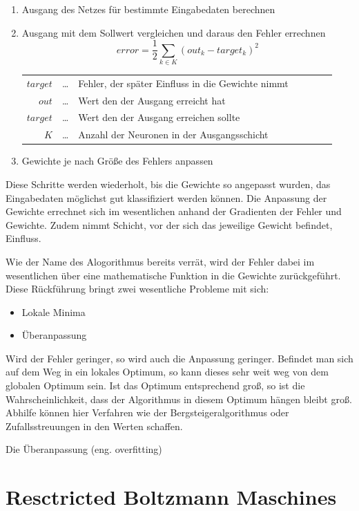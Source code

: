 \begin{enumerate}
\item Ausgang des Netzes für bestimmte Eingabedaten berechnen
\item Ausgang mit dem Sollwert vergleichen und daraus den Fehler errechnen
	$$error = \frac{1}{2}\sum_{k \in K}(out_k-target_k)^2$$
	\begin{center}\begin{tabular}{rclcrcl}
		$target$ & \dots & Fehler, der später Einfluss in die Gewichte nimmt\\
		$out$ & \dots & Wert den der Ausgang erreicht hat\\
		$target$ & \dots & Wert den der Ausgang erreichen sollte\\ 
		$K$ & \dots & Anzahl der Neuronen in der Ausgangsschicht\\
	\end{tabular}\end{center}
\item Gewichte je nach Größe des Fehlers anpassen
\end{enumerate}

Diese Schritte werden wiederholt, bis die Gewichte so angepasst wurden, das Eingabedaten möglichst gut klassifiziert werden können. Die Anpassung der Gewichte errechnet sich im wesentlichen anhand der Gradienten der Fehler und Gewichte. Zudem nimmt Schicht, vor der sich das jeweilige Gewicht befindet, Einfluss.

Wie der Name des Alogorithmus bereits verrät, wird der Fehler dabei im wesentlichen über eine mathematische Funktion in die Gewichte zurückgeführt. Diese Rückführung bringt zwei wesentliche Probleme mit sich:

\begin{itemize}
\item Lokale Minima
\item Überanpassung
\end{itemize}

Wird der Fehler geringer, so wird auch die Anpassung geringer. Befindet man sich auf dem Weg in ein lokales Optimum, so kann dieses sehr weit weg von dem globalen Optimum sein. Ist das Optimum entsprechend groß, so ist die Wahrscheinlichkeit, dass der Algorithmus in diesem Optimum hängen bleibt groß. Abhilfe können hier Verfahren wie der Bergsteigeralgorithmus oder Zufallsstreuungen in den Werten schaffen.

Die Überanpassung (eng. overfitting) 

\section{Resctricted Boltzmann Maschines}

